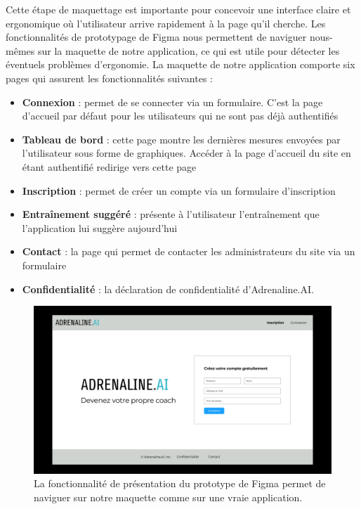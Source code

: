 \documentclass[french]{article}
\begin{document}
    Cette étape de maquettage est importante pour concevoir une interface claire et ergonomique où l'utilisateur arrive rapidement à la page qu'il cherche. Les fonctionnalités de prototypage de Figma nous permettent de naviguer nous-mêmes sur la maquette de notre application, ce qui est utile pour détecter les éventuels problèmes d'ergonomie.
    La maquette de notre application comporte six pages qui assurent les fonctionnalités suivantes :
    \begin{itemize}
        \item \textbf{Connexion} : permet de se connecter via un formulaire. C'est la page d'accueil par défaut pour les utilisateurs qui ne sont pas déjà authentifiés
        \item \textbf{Tableau de bord} : cette page montre les dernières mesures envoyées par l'utilisateur sous forme de graphiques. Accéder à la page d'accueil du site en étant authentifié redirige vers cette page
        \item \textbf{Inscription} : permet de créer un compte via un formulaire d'inscription
        \item \textbf{Entraînement suggéré} : présente à l'utilisateur l'entraînement que l'application lui suggère aujourd'hui
        \item \textbf{Contact} : la page qui permet de contacter les administrateurs du site via un formulaire
        \item \textbf{Confidentialité} : la déclaration de confidentialité d'Adrenaline.AI.
    \end{itemize}

    \begin{figure}[h!]
        \includegraphics[width=12cm]{figma2}
        \centering
        \caption{La fonctionnalité de présentation du prototype de Figma permet de naviguer sur notre maquette comme sur une vraie application.}
        \centering
    \end{figure}
\end{document}
